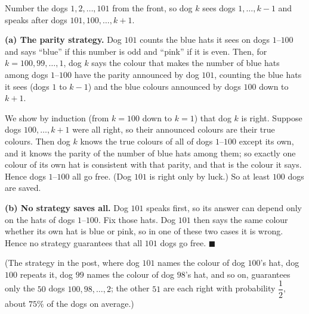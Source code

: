 Number the dogs $1,2,\dots,101$ from the front, so dog $k$ sees dogs $1,\dots,k-1$ and speaks after dogs $101,100,\dots,k+1$.

\textbf{(a) The parity strategy.} Dog $101$ counts the blue hats it sees on dogs $1$--$100$ and says ``blue'' if this number is odd and ``pink'' if it is even. Then, for $k=100,99,\dots,1$, dog $k$ says the colour that makes the number of blue hats among dogs $1$--$100$ have the parity announced by dog $101$, counting the blue hats it sees (dogs $1$ to $k-1$) and the blue colours announced by dogs $100$ down to $k+1$.

We show by induction (from $k=100$ down to $k=1$) that dog $k$ is right. Suppose dogs $100,\dots,k+1$ were all right, so their announced colours are their true colours. Then dog $k$ knows the true colours of all of dogs $1$--$100$ except its own, and it knows the parity of the number of blue hats among them; so exactly one colour of its own hat is consistent with that parity, and that is the colour it says. Hence dogs $1$--$100$ all go free. (Dog $101$ is right only by luck.) So at least $\boxed{100}$ dogs are saved.

\textbf{(b) No strategy saves all.} Dog $101$ speaks first, so its answer can depend only on the hats of dogs $1$--$100$. Fix those hats. Dog $101$ then says the same colour whether its own hat is blue or pink, so in one of these two cases it is wrong. Hence no strategy guarantees that all $101$ dogs go free. $\blacksquare$

(The strategy in the post, where dog $101$ names the colour of dog $100$'s hat, dog $100$ repeats it, dog $99$ names the colour of dog $98$'s hat, and so on, guarantees only the $50$ dogs $100,98,\dots,2$; the other $51$ are each right with probability $\dfrac12$, about $75\%$ of the dogs on average.)
